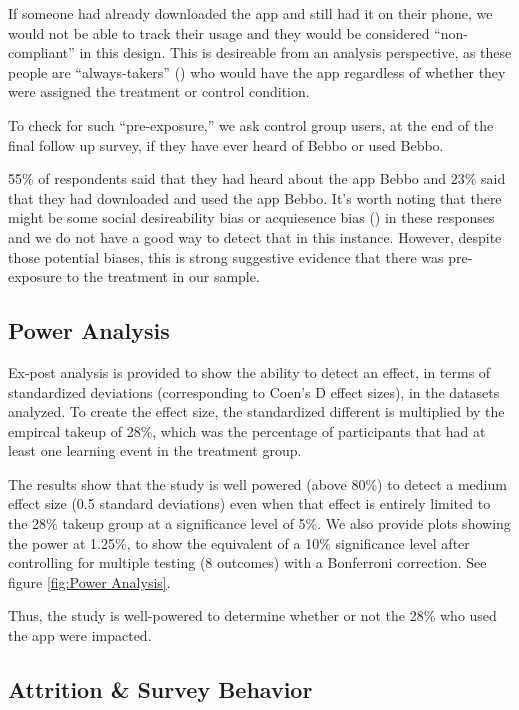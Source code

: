 \documentclass{article}
\begin{document}
If someone had already downloaded the app and still had it on their phone, we would not be able to track their usage and they would be considered ``non-compliant'' in this design. This is desireable from an analysis perspective, as these people are ``always-takers'' (\cite{Imbens2015}) who would have the app regardless of whether they were assigned the treatment or control condition.

To check for such ``pre-exposure,'' we ask control group users, at the end of the final follow up survey, if they have ever heard of Bebbo or used Bebbo.

55\% of respondents said that they had heard about the app Bebbo and 23\% said that they had downloaded and used the app Bebbo. It's worth noting that there might be some social desireability bias or acquiesence bias (\cite{Stantcheva2023}) in these responses and we do not have a good way to detect that in this instance. However, despite those potential biases, this is strong suggestive evidence that there was pre-exposure to the treatment in our sample.



\subsection*{Power Analysis}

Ex-post analysis is provided to show the ability to detect an effect, in terms of standardized deviations (corresponding to Coen's D effect sizes), in the datasets analyzed. To create the effect size, the standardized different is multiplied by the empircal takeup of 28\%, which was the percentage of participants that had at least one learning event in the treatment group.

The results show that the study is well powered (above 80\%) to detect a medium effect size (0.5 standard deviations) even when that effect is entirely limited to the 28\% takeup group at a significance level of 5\%. We also provide plots showing the power at 1.25\%, to show the equivalent of a 10\% significance level after controlling for multiple testing (8 outcomes) with a Bonferroni correction. See figure \ref{fig:Power Analysis}.

Thus, the study is well-powered to determine whether or not the 28\% who used the app were impacted.


\subsection*{Attrition \& Survey Behavior}
\end{document}
